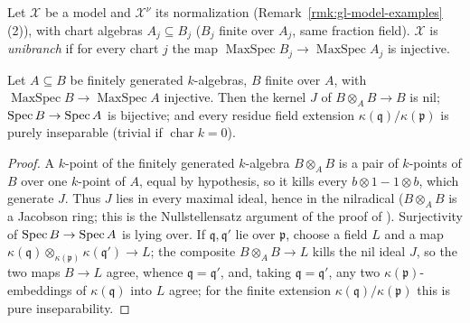 \begin{definition}\label{def:gl-unibranch}
\leanok
{}
Let $\mathcal X$ be a model and $\mathcal X^\nu$ its normalization (Remark~\ref{rmk:gl-model-examples}(2)), with chart algebras $A_j\subseteq B_j$ ($B_j$ finite over
$A_j$, same fraction field). $\mathcal X$ is \emph{unibranch} if for every chart $j$ the map $\operatorname{MaxSpec}B_j\to\operatorname{MaxSpec}A_j$ is injective.
\end{definition}

\begin{lemma}\label{lem:gl-radicial}
\leanok
Let $A\subseteq B$ be finitely generated $k$-algebras, $B$ finite over $A$, with $\operatorname{MaxSpec}B\to\operatorname{MaxSpec}A$ injective. Then the kernel $J$ of
$B\otimes_AB\to B$ is nil; $\operatorname{Spec} B\to\operatorname{Spec} A$ is bijective; and every residue field extension $\kappa(\mathfrak q)/\kappa(\mathfrak p)$ is purely inseparable (trivial
if $\operatorname{char}k=0$).
\end{lemma}

\begin{proof}
A $k$-point of the finitely generated $k$-algebra $B\otimes_AB$ is a pair of $k$-points of $B$ over one $k$-point of $A$, equal by hypothesis, so it kills every
$b\otimes1-1\otimes b$, which generate $J$. Thus $J$ lies in every maximal ideal, hence in the nilradical ($B\otimes_AB$ is a Jacobson ring; this is the
Nullstellensatz argument of the proof of \cite[Lemma~8.1]{FHX}). Surjectivity of $\operatorname{Spec} B\to\operatorname{Spec} A$ is lying over. If $\mathfrak q,\mathfrak q'$ lie over $\mathfrak p$,
choose a field $L$ and a map $\kappa(\mathfrak q)\otimes_{\kappa(\mathfrak p)}\kappa(\mathfrak q')\to L$; the composite $B\otimes_AB\to L$ kills the nil ideal $J$, so the two maps
$B\to L$ agree, whence $\mathfrak q=\mathfrak q'$, and, taking $\mathfrak q=\mathfrak q'$, any two $\kappa(\mathfrak p)$-embeddings of $\kappa(\mathfrak q)$ into $L$ agree; for the
finite extension $\kappa(\mathfrak q)/\kappa(\mathfrak p)$ this is pure inseparability.
\end{proof}


